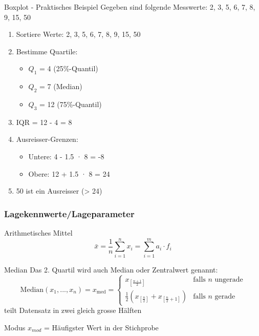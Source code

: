 \begin{example2}{Boxplot - Praktisches Beispiel}
Gegeben sind folgende Messwerte: 2, 3, 5, 6, 7, 8, 9, 15, 50
\begin{enumerate}
    \item Sortiere Werte: 2, 3, 5, 6, 7, 8, 9, 15, 50
    \item Bestimme Quartile:
        \begin{itemize}
            \item $Q_1$ = 4 (25\%-Quantil)
            \item $Q_2$ = 7 (Median)
            \item $Q_3$ = 12 (75\%-Quantil)
        \end{itemize}
    \item IQR = 12 - 4 = 8
    \item Ausreisser-Grenzen:
        \begin{itemize}
            \item Untere: 4 - 1.5 · 8 = -8
            \item Obere: 12 + 1.5 · 8 = 24
        \end{itemize}
    \item 50 ist ein Ausreisser (> 24)
\end{enumerate}
\end{example2}

\raggedcolumns
\columnbreak

\subsubsection{Lagekennwerte/Lageparameter}

\begin{concept}{Arithmetisches Mittel}
    $$\bar{x} = \frac{1}{n}\sum_{i=1}^n x_i = \sum_{i=1}^m a_i \cdot f_i$$
\end{concept}

\begin{concept}{Median} Das 2. Quartil wird auch Median oder Zentralwert genannt:
    $$\text{Median}(x_1,...,x_n) = x_{\text{med}} = \begin{cases}
    x_{[\frac{n+1}{2}]} & \text{falls } n \text{ ungerade}\\
    \frac{1}{2}(x_{[\frac{n}{2}]} + x_{[\frac{n}{2}+1]}) & \text{falls } n \text{ gerade}
    \end{cases}$$
    teilt Datensatz in zwei gleich grosse Hälften
\end{concept}

\begin{concept}{Modus}
    $x_{mod}$ = Häufigster Wert in der Stichprobe
\end{concept}

